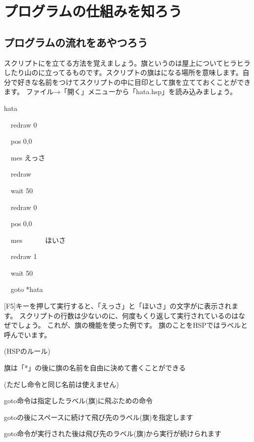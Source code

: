 \clearpage

\section{プログラムの仕組みを知ろう}
\subsection{プログラムの流れをあやつろう}

スクリプトにを立てる方法を覚えましょう。旗というのは屋上についてヒラヒラしたり山のに立ってるものです。スクリプトの旗はになる場所を意味します。自分で好きな名前をつけてスクリプトの中に目印として旗を立てておくことができます。
ファイル→「開く」メニューから「hata.hsp」を読み込みましょう。

\begin{description}
    \item *hata
    \item \ \ redraw 0
    \item \ \ pos 0,0
    \item \ \ mes {\textquotedbl}えっさ{\textquotedbl}
    \item \ \ redraw 
    \item \ \ wait 50
    \item \ \ redraw 0
    \item \ \ pos 0,0
    \item \ \ mes {\textquotedbl}　　　ほいさ{\textquotedbl}
    \item \ \ redraw 1
    \item \ \ wait 50
    \item \ \ goto *hata
\end{description}

[F5]キーを押して実行すると、「えっさ」と「ほいさ」の文字がに表示されます。
スクリプトの行数は少ないのに、何度もくり返して実行されているのはなぜでしょう。
これが、旗の機能を使った例です。
旗のことをHSPではラベルと呼んでいます。

\begin{description}
    \item (HSPのルール)
\end{description}

\begin{description}
    \item 旗は「*」の後に旗の名前を自由に決めて書くことができる
    \item (ただし命令と同じ名前は使えません)
    \item goto命令は指定したラベル(旗)に飛ぶための命令
    \item gotoの後にスペースに続けて飛び先のラベル(旗)を指定します
    \item goto命令が実行された後は飛び先のラベル(旗)から実行が続けられます
\end{description}

